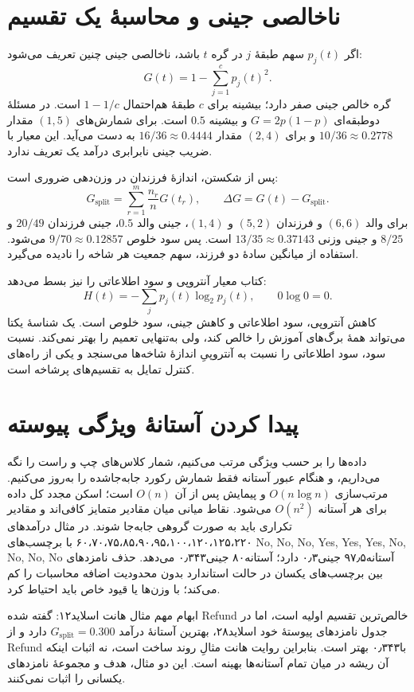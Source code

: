 \section{ناخالصی جینی و محاسبهٔ یک تقسیم}

اگر $p_j(t)$ سهم طبقهٔ $j$ در گره $t$ باشد، ناخالصی جینی چنین تعریف می‌شود:
\[G(t)=1-\sum_{j=1}^c p_j(t)^2.\]
گره خالص جینی صفر دارد؛ بیشینه برای $c$ طبقهٔ هم‌احتمال $1-1/c$ است. در مسئلهٔ دوطبقه‌ای $G=2p(1-p)$ و بیشینه $0.5$ است. برای شمارش‌های $(1,5)$ مقدار $10/36\approx0.2778$ و برای $(2,4)$ مقدار $16/36\approx0.4444$ به دست می‌آید. این معیار با ضریب جینی نابرابری درآمد یک تعریف ندارد.

پس از شکستن، اندازهٔ فرزندان در وزن‌دهی ضروری است:
\[G_{\mathrm{split}}=\sum_{r=1}^m\frac{n_r}{n}G(t_r),\qquad \Delta G=G(t)-G_{\mathrm{split}}.\]
برای والد $(6,6)$ و فرزندان $(5,2)$ و $(1,4)$، جینی والد $0.5$، جینی فرزندان $20/49$ و $8/25$ و جینی وزنی $13/35\approx0.37143$ است. پس سود خلوص $9/70\approx0.12857$ می‌شود. استفاده از میانگین سادهٔ دو فرزند، سهم جمعیت هر شاخه را نادیده می‌گیرد.

کتاب معیار آنتروپی و سود اطلاعاتی را نیز بسط می‌دهد:
\[H(t)=-\sum_j p_j(t)\log_2p_j(t),\qquad 0\log 0=0.\]
کاهش آنتروپی، سود اطلاعاتی و کاهش جینی، سود خلوص است. یک شناسهٔ یکتا می‌تواند همهٔ برگ‌های آموزش را خالص کند، ولی به‌تنهایی تعمیم را بهتر نمی‌کند. نسبت سود، سود اطلاعاتی را نسبت به آنتروپیِ اندازهٔ شاخه‌ها می‌سنجد و یکی از راه‌های کنترل تمایل به تقسیم‌های پرشاخه است.

\section{پیدا کردن آستانهٔ ویژگی پیوسته}

داده‌ها را بر حسب ویژگی مرتب می‌کنیم، شمار کلاس‌های چپ و راست را نگه می‌داریم، و هنگام عبور آستانه فقط شمارش رکورد جابه‌جا‌شده را به‌روز می‌کنیم. مرتب‌سازی $O(n\log n)$ و پیمایش پس از آن $O(n)$ است؛ اسکن مجدد کل داده برای هر آستانه $O(n^2)$ می‌شود. نقاط میانی میان مقادیر متمایز کافی‌اند و مقادیر تکراری باید به صورت گروهی جابه‌جا شوند. در مثال درآمدهای ۶۰،۷۰،۷۵،۸۵،۹۰،۹۵،۱۰۰،۱۲۰،۱۲۵،۲۲۰ با برچسب‌های No, No, No, Yes, Yes, Yes, No, No, No, No آستانه۹۷٫۵ جینی۰٫۳ دارد؛ آستانه۸۰ جینی۰٫۳۴۳ می‌دهد. حذف نامزدهای بین برچسب‌های یکسان در حالت استاندارد بدون محدودیت اضافه محاسبات را کم می‌کند؛ با وزن‌ها یا قیود خاص باید احتیاط کرد.

ابهام مهم مثال هانت اسلاید۱۲: گفته شده Refund خالص‌ترین تقسیم اولیه است، اما در جدول نامزدهای پیوستهٔ خود اسلاید۲۸، بهترین آستانهٔ درآمد $G_{\mathrm{split}}=0.300$ دارد و از Refund با۰٫۳۴۳ بهتر است. بنابراین روایت هانت مثالِ روند ساخت است، نه اثبات اینکه آن ریشه در میان تمام آستانه‌ها بهینه است. این دو مثال، هدف و مجموعهٔ نامزدهای یکسانی را اثبات نمی‌کنند.



